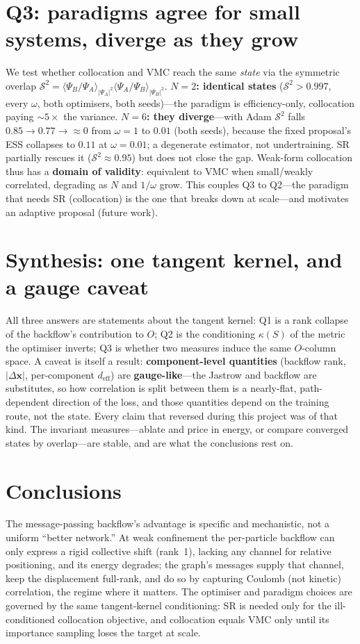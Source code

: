 \section{Q3: paradigms agree for small systems, diverge as they grow}
\label{sec:q3}

We test whether collocation and VMC reach the same \emph{state} via the symmetric
overlap $\mathcal{S}^2=\langle\Psi_B/\Psi_A\rangle_{|\Psi_A|^2}
\langle\Psi_A/\Psi_B\rangle_{|\Psi_B|^2}$.
\textbf{$N=2$: identical states} ($\mathcal{S}^2>0.997$, every $\omega$, both
optimisers, both seeds)---the paradigm is efficiency-only, collocation paying
$\sim\!5\times$ the variance. \textbf{$N=6$: they diverge}---with Adam
$\mathcal{S}^2$ falls $0.85\to0.77\to\approx0$ from $\omega=1$ to $0.01$ (both
seeds), because the fixed proposal's ESS collapses to $0.11$ at $\omega=0.01$;
a degenerate estimator, not undertraining. SR partially rescues it
($\mathcal{S}^2\!\approx\!0.95$) but does not close the gap. Weak-form collocation
thus has a \textbf{domain of validity}: equivalent to VMC when small/weakly
correlated, degrading as $N$ and $1/\omega$ grow. This couples Q3 to Q2---the
paradigm that needs SR (collocation) is the one that breaks down at scale---and
motivates an adaptive proposal (future work).

\section{Synthesis: one tangent kernel, and a gauge caveat}
\label{sec:synthesis}

All three answers are statements about the tangent kernel: Q1 is a rank collapse
of the backflow's contribution to $O$; Q2 is the conditioning $\kappa(S)$ of the
metric the optimiser inverts; Q3 is whether two measures induce the same
$O$-column space. A caveat is itself a result: \textbf{component-level quantities}
(backflow rank, $|\Delta\mathbf{x}|$, per-component $d_{\mathrm{eff}}$) are
\textbf{gauge-like}---the Jastrow and backflow are substitutes, so how correlation
is split between them is a nearly-flat, path-dependent direction of the loss, and
those quantities depend on the training route, not the state. Every claim that
reversed during this project was of that kind. The invariant measures---ablate and
price in energy, or compare converged states by overlap---are stable, and are what
the conclusions rest on.

\section*{Conclusions}
The message-passing backflow's advantage is specific and mechanistic, not a uniform
``better network.'' At weak confinement the per-particle backflow can only express
a rigid collective shift (rank~1), lacking any channel for relative positioning,
and its energy degrades; the graph's messages supply that channel, keep the
displacement full-rank, and do so by capturing Coulomb (not kinetic) correlation,
the regime where it matters. The optimiser and paradigm choices are governed by the
same tangent-kernel conditioning: SR is needed only for the ill-conditioned
collocation objective, and collocation equals VMC only until its importance
sampling loses the target at scale.
